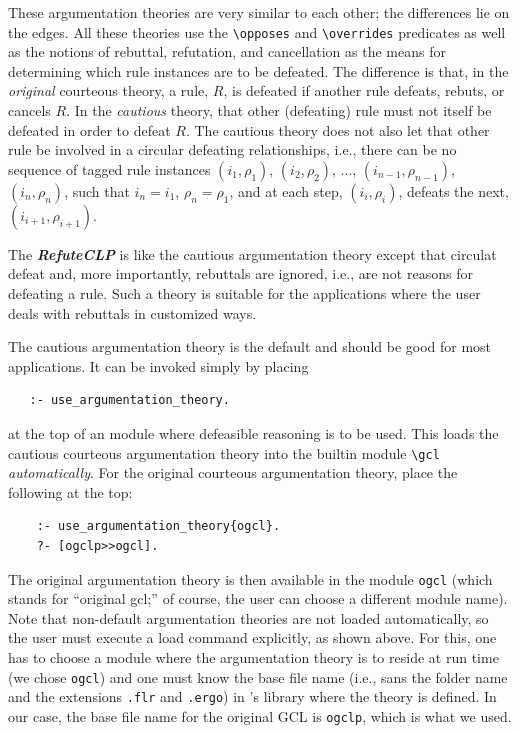 \documentclass[11pt]{article}
\newcommand{\ERGO}{\mbox{\smaller{\ensuremath{\cal{E}}\smaller{{\sc{RGO}}}}}\xspace}
\newcommand{\FLSYSTEM}{\ERGO}
\newcommand{\bs}{\textbackslash}
\begin{document}
These argumentation theories are very similar to each other; the
differences lie on the edges. All these theories use the {\tt \bs{}opposes} and
{\tt \bs{}overrides} predicates as well as the notions of rebuttal,
refutation, and cancellation as the means for determining which rule
instances are to be defeated. The difference is that, in the \emph{original} courteous
theory, a rule, $R$, is defeated if another rule defeats, rebuts, or
cancels $R$.
In the \emph{cautious} theory, that other (defeating)
rule must not itself be defeated in order to
defeat $R$. The cautious theory does not also let that other rule be
involved in a circular defeating relationships,
i.e., there can be no sequence of
  tagged rule instances $(i_1,\rho_1)$, $(i_2,\rho_2)$, ...,
  $(i_{n-1},\rho_{n-1})$, $(i_n,\rho_n)$, such that $i_n=i_1$,
  $\rho_n=\rho_1$, and at each step, $(i_i,\rho_i)$, defeats the next,
  $(i_{i+1},\rho_{i+1})$.

The \textbf{\emph{RefuteCLP}}  is like the cautious argumentation
theory except that circulat defeat and, more importantly,
rebuttals are ignored, i.e., are not reasons for defeating a rule.
Such a theory is suitable for the applications where the user deals with
rebuttals in customized ways.

The cautious argumentation theory is the default and should be good for most
  applications. It can be invoked simply by placing
\begin{verbatim}
   :- use_argumentation_theory.
\end{verbatim}
  at the top of an \FLSYSTEM module where defeasible reasoning is to be
  used.  This loads the cautious courteous argumentation theory into the builtin
  module {\tt \bs{}gcl} \emph{automatically}. For the original courteous argumentation theory,
  place the following at the top:
\begin{verbatim}
    :- use_argumentation_theory{ogcl}.
    ?- [ogclp>>ogcl].
\end{verbatim}
The original argumentation theory is then available in the module {\tt ogcl}
(which stands for ``original gcl;'' of course, the user can choose a different module name).
Note that non-default argumentation theories are not loaded
automatically, so the user must execute a load command explicitly, as shown
above. For this, one has to choose a module where the
argumentation theory is to reside at run time
(we chose \texttt{ogcl}) and one must know the base file
name (i.e., sans the folder name and the extensions \texttt{.flr} and
\texttt{.ergo}) in \FLSYSTEM's library where the theory is defined. In our case, the base file name
for the original GCL is \texttt{ogclp}, which is what we used. 
\end{document}
